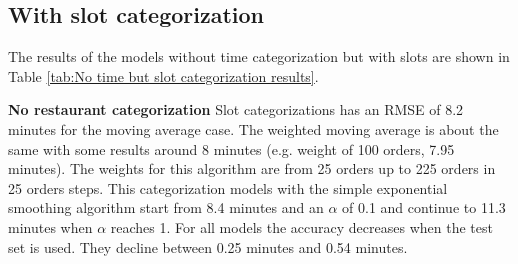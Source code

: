 \subsection{With slot categorization}
The results of the models without time categorization but with slots are shown in Table \ref{tab:No time but slot categorization results}.
\begin{table}[h]
\centering
\caption{No time but slot categorization}
\label{tab:No time but slot categorization results}
\end{table}
\newline\newline\textbf{No restaurant categorization}\newline
Slot categorizations has an RMSE of 8.2 minutes for the moving average case. The weighted moving average is about the same with some results around 8 minutes (e.g. weight of 100 orders, 7.95 minutes). The weights for this algorithm are from 25 orders up to 225 orders in 25 orders steps. This categorization models with the simple exponential smoothing algorithm start from 8.4 minutes and an $\alpha$ of 0.1 and continue to 11.3 minutes when $\alpha$ reaches 1. For all models the accuracy decreases when the test set is used. They decline between 0.25 minutes and 0.54 minutes.\newline
